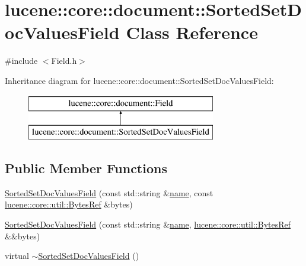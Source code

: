 \hypertarget{classlucene_1_1core_1_1document_1_1SortedSetDocValuesField}{}\section{lucene\+:\+:core\+:\+:document\+:\+:Sorted\+Set\+Doc\+Values\+Field Class Reference}
\label{classlucene_1_1core_1_1document_1_1SortedSetDocValuesField}


{\ttfamily \#include $<$Field.\+h$>$}

Inheritance diagram for lucene\+:\+:core\+:\+:document\+:\+:Sorted\+Set\+Doc\+Values\+Field\+:\begin{figure}[H]
\begin{center}
\leavevmode
\includegraphics[height=2.000000cm]{classlucene_1_1core_1_1document_1_1SortedSetDocValuesField}
\end{center}
\end{figure}
\subsection*{Public Member Functions}
\begin{DoxyCompactItemize}
\item 
\mbox{\hyperlink{classlucene_1_1core_1_1document_1_1SortedSetDocValuesField_a606d942fd2669a07d9ed7fa7575e7248}{Sorted\+Set\+Doc\+Values\+Field}} (const std\+::string \&\mbox{\hyperlink{classlucene_1_1core_1_1document_1_1Field_a52f673f3b3abb14b180f5159f4726537}{name}}, const \mbox{\hyperlink{classlucene_1_1core_1_1util_1_1BytesRef}{lucene\+::core\+::util\+::\+Bytes\+Ref}} \&bytes)
\item 
\mbox{\hyperlink{classlucene_1_1core_1_1document_1_1SortedSetDocValuesField_a5a10fe1cd30b6c1d0803430058b7c808}{Sorted\+Set\+Doc\+Values\+Field}} (const std\+::string \&\mbox{\hyperlink{classlucene_1_1core_1_1document_1_1Field_a52f673f3b3abb14b180f5159f4726537}{name}}, \mbox{\hyperlink{classlucene_1_1core_1_1util_1_1BytesRef}{lucene\+::core\+::util\+::\+Bytes\+Ref}} \&\&bytes)
\item 
virtual \mbox{\hyperlink{classlucene_1_1core_1_1document_1_1SortedSetDocValuesField_af3650bc6499d15f6f1f6b744200423a8}{$\sim$\+Sorted\+Set\+Doc\+Values\+Field}} ()
\end{DoxyCompactItemize}
